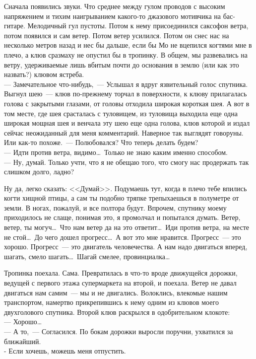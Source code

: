 Сначала появились звуки. Что среднее между гулом проводов с высоким напряжением 
и тихим наигрыванием какого-то джазового мотивчика на бас-гитаре. Мелодичный 
гул пустоты. Потом к нему присоединился саксофон ветра, потом появился и сам ветер. 
Потом ветер усилился. Потом он снес нас на несколько метров назад и нес бы 
дальше, если бы Мо не вцепился когтями мне в плечо, а клюв сразмаху не опустил 
бы в тропинку. В общем, мы развевались на ветру, удерживаемые лишь вбитым почти 
до основания в землю (или как это назвать?) клювом ястреба.\\
--- Замечательное что-нибудь,~--- Услышал я вдруг язвительный голос спутника. 
Выгнул шею~--- клюв по-прежнему торчал в поверхности, к клюву прилагалась голова с 
закрытыми глазами, от головы отходила широкая короткая шея. А вот в том месте, 
где шея срасталась с туловищем, из туловища выходила еще одна широкая мощная 
шея и венчала эту шею еще одна голова, клюв которой и издал сейчас неожиданный для 
меня комментарий. Наверное так выглядят говоруны. Или как-то похоже.~--- 
Полюбовался? Что теперь делать будем?\\
--- Идти против ветра, видимо\ldots\ Только не знаю каким именно способом.\\
--- Ну, думай. Только учти, что я не обещаю того, что смогу нас продержать так 
слишком долго, ладно?


Ну да, легко сказать: <<Думай>>. Подумаешь тут, когда в плечо тебе впились 
когти хищной птицы, а сам ты подобно тряпке трепыхаешься в полуметре от земли. В 
ногах, пожалуй, и все полтора будут. Впрочем, спутнику моему приходилось не 
слаще, понимая это, я промолчал и попытался думать. Ветер, ветер, ты 
могуч\ldots\ Что нам ветер да на это ответит\ldots\ Иди против ветра, на месте не 
стой\ldots\ До чего дошел прогресс\ldots\ А вот это мне нравится. Прогресс~--- это хорошо. 
Прогресс~--- это двигатель человечества. А нам надо двигаться вперед, шагать, смело шагать\ldots\
Шагай смелее, провинциалка\ldots

Тропинка поехала. Сама. Превратилась в что-то вроде движущейся дорожки, ведущей 
с первого этажа супермаркета на второй, и поехала. Ветер не давал двигаться нам 
самим~--- мы и не двигались. Волоклись, влекомые нашим транспортом, намертво 
прикрепившись к нему одним из клювов моего двухголового спутника. Второй клюв 
раскрылся в одобрительном клокоте:\\
--- Хорошо\ldots\\
--- А то,~--- Согласился. По бокам дорожки выросли поручни, ухватился за 
ближайший. \\
- Если хочешь, можешь меня отпустить.\\

